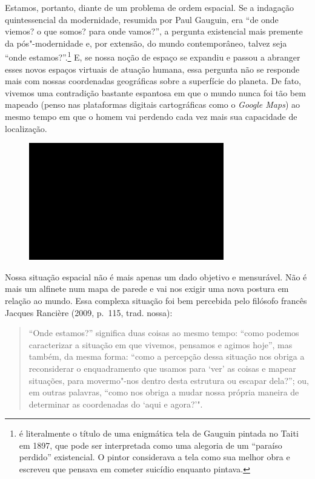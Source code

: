 Estamos, portanto, diante de um problema de ordem espacial. Se a
indagação quintessencial da modernidade, resumida por Paul Gauguin, era
``de onde viemos? o que somos? para onde vamos?'', a pergunta
existencial mais premente da pós"-modernidade e, por extensão, do mundo
contemporâneo, talvez seja ``onde estamos?''.\footnote{{} é literalmente o título de uma
  enigmática tela de Gauguin pintada no Taiti em 1897, que pode ser
  interpretada como uma alegoria de um ``paraíso perdido'' existencial.
  O pintor considerava a tela como sua melhor obra e escreveu que
  pensava em cometer suicídio enquanto pintava.} E, se nossa noção de
espaço se expandiu e passou a abranger esses novos espaços virtuais de
atuação humana, essa pergunta não se responde mais com nossas
coordenadas geográficas sobre a superfície do planeta. De fato, vivemos
uma contradição bastante espantosa em que o mundo nunca foi tão bem
mapeado (penso nas plataformas digitais cartográficas como o
\emph{Google Maps}) ao mesmo tempo em que o homem vai perdendo cada vez
mais sua capacidade de localização.

\begin{figure}[!ht]
\centering
 \includegraphics[width=85mm]{./imgs/im1.jpg}
\caption{\tiny{}}
\end{figure}

Nossa situação espacial não é mais apenas um dado objetivo e mensurável.
Não é mais um alfinete num mapa de parede e vai nos exigir uma nova
postura em relação ao mundo. Essa complexa situação foi bem percebida
pelo filósofo francês Jacques Rancière (2009, p.~115, trad. nossa):

\begin{quote}
``Onde estamos?'' significa duas coisas ao mesmo tempo: ``como podemos
caracterizar a situação em que vivemos, pensamos e agimos hoje'', mas
também, da mesma forma: ``como a percepção dessa situação nos obriga a
reconsiderar o enquadramento que usamos para `ver' as coisas e mapear
situações, para movermo"-nos dentro desta estrutura ou escapar dela?'';
ou, em outras palavras, ``como nos obriga a mudar nossa própria maneira
de determinar as coordenadas do `aqui e agora?'".
\end{quote}


